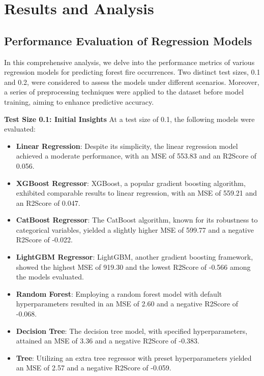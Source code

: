 \chapter{Results and Analysis}
\label{ch:results}
\section{Performance Evaluation of Regression Models}
In this comprehensive analysis, we delve into the performance metrics of various regression models for predicting forest fire occurrences. Two distinct test sizes, 0.1 and 0.2, were considered to assess the models under different scenarios. Moreover, a series of preprocessing techniques were applied to the dataset before model training, aiming to enhance predictive accuracy.

\textbf{Test Size 0.1: Initial Insights}
At a test size of 0.1, the following models were evaluated:
\begin{itemize}
 \item \textbf{Linear Regression}: Despite its simplicity, the linear regression model achieved a moderate performance, with an MSE of 553.83 and an R2Score of 0.056.

 \item \textbf{XGBoost Regressor}: XGBoost, a popular gradient boosting algorithm, exhibited comparable results to linear regression, with an MSE of 559.21 and an R2Score of 0.047.

 \item \textbf{CatBoost Regressor}: The CatBoost algorithm, known for its robustness to categorical variables, yielded a slightly higher MSE of 599.77 and a negative R2Score of -0.022.

 \item \textbf{LightGBM Regressor}: LightGBM, another gradient boosting framework, showed the highest MSE of 919.30 and the lowest R2Score of -0.566 among the models evaluated.

 \item \textbf{Random Forest}: Employing a random forest model with default hyperparameters resulted in an MSE of 2.60 and a negative R2Score of -0.068.

 \item \textbf{Decision Tree}: The decision tree model, with specified hyperparameters, attained an MSE of 3.36 and a negative R2Score of -0.383.

 \item  \textbf{Tree}: Utilizing an extra tree regressor with preset hyperparameters yielded an MSE of 2.57 and a negative R2Score of -0.059.
 \end{itemize}
 
